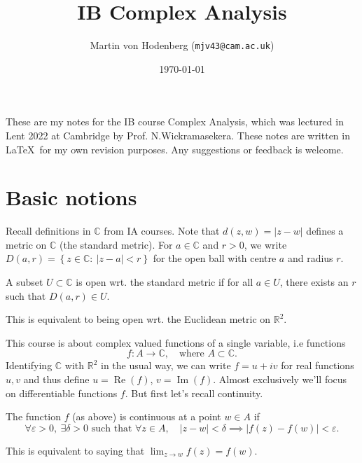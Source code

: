\documentclass[a4paper]{scrartcl}
\title{IB Complex Analysis}
\author{Martin von Hodenberg (\texttt{mjv43@cam.ac.uk})}
\date{\today}
\begin{document}
\maketitle
These are my notes for the IB course Complex Analysis, which was lectured in Lent 2022 at Cambridge by Prof. N.Wickramasekera. These notes are written in \LaTeX  \ for my own revision purposes. Any suggestions or feedback is welcome.

\tableofcontents
\newpage

\section{Basic notions}
Recall definitions in $\mathbb{C}$ from IA courses. Note that $d (z,w)=|z-w|$ defines a metric on $\mathbb{C}$ (the standard metric). For $a \in \mathbb{C}$ and $r >0$, we write $D (a,r)= \left\{z \in \mathbb{C}: \ |z-a|<r \right\}$ for the open ball with centre $a$ and radius $r$. 
\begin{definition}
     A subset $U \subset \mathbb{C}$ is open wrt. the standard metric if for all $a \in U$, there exists an $r$ such that $D (a,r) \in U$.
\end{definition} 
\begin{remark}
     This is equivalent to being open wrt. the Euclidean metric on $\mathbb{R}^{2} $.
\end{remark}

This course is about complex valued functions of a single variable, i.e functions \[
f: A \rightarrow \mathbb{C}, \quad \text{where } A \subset \mathbb{C}
.\] 
Identifying $\mathbb{C}$ with $\mathbb{R}^2$ in the usual way, we can write $f=u+iv$ for real functions $u,v$ and thus define $u= \operatorname{Re} (f)$, $v=\operatorname{Im} (f)$. 
Almost exclusively we'll focus on differentiable functions $f$. But first let's recall continuity. 
\begin{definition}
     The function $f$ (as above) is continuous at a point $w \in A$ if \[
     \forall \varepsilon >0, \ \exists \delta >0 \text{ such that } \forall z \in A,\quad  |z-w|<\delta \implies |f (z)- f (w)| <\varepsilon
     .\] 
\end{definition}
\begin{remark}
     This is equivalent to saying that $\lim_{z \rightarrow w} f(z)=f (w) $. 
\end{remark}
\end{document}
